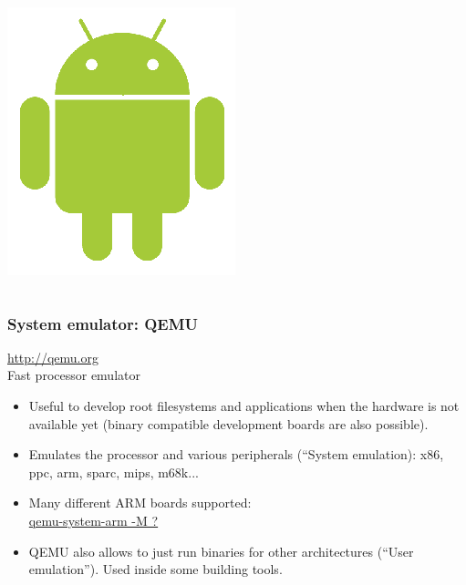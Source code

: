 \begin{frame}
\begin{columns}
    \includegraphics[width=\textwidth]{slides/sysdev-embedded-linux/android.png}\\
  \end{columns}
\end{frame}

\begin{frame}
  \frametitle{System emulator: QEMU}
  \url{http://qemu.org}\\
  Fast processor emulator
  \begin{itemize}
  \item Useful to develop root filesystems and applications when the
    hardware is not available yet (binary compatible development
    boards are also possible).
  \item Emulates the processor and various peripherals (“System
    emulation): x86, ppc, arm, sparc, mips, m68k...
  \item Many different ARM boards supported:\\
    \url{qemu-system-arm -M ?}
  \item QEMU also allows to just run binaries for other architectures
    (``User emulation''). Used inside some building tools.
  \end{itemize}
\end{frame}

